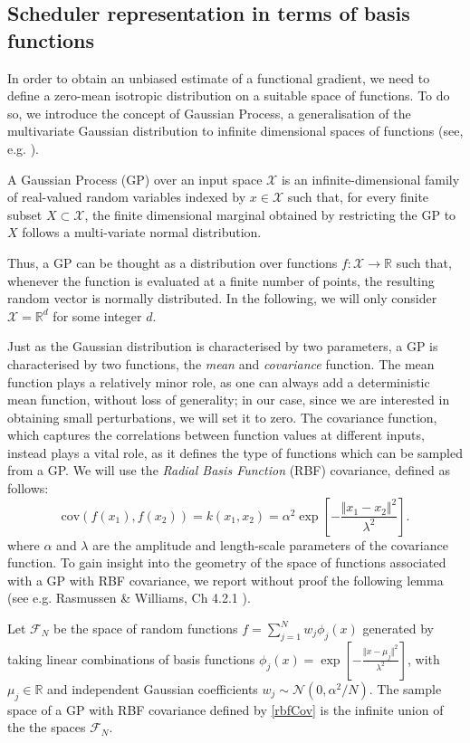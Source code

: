 \subsection{Scheduler representation in terms of basis functions}

In order to obtain an unbiased estimate of a functional gradient, we need to define a zero-mean isotropic distribution on a suitable space of functions. To do so, we introduce the concept of Gaussian Process, a generalisation of the multivariate Gaussian distribution to infinite dimensional spaces of functions (see, e.g. \cite{Rasmussen2006}).

\begin{definition} A Gaussian Process (GP) over an input space $\mathcal{X}$ is an infinite-dimensional family of real-valued random variables indexed by $x\in\mathcal{X}$ such that, for every finite subset $X\subset\mathcal{X}$, the finite dimensional marginal obtained by restricting the GP to $X$ follows a multi-variate normal distribution.
\end{definition}
Thus, a GP can be thought as a distribution over functions $f\colon\mathcal{X}\rightarrow\mathbb{R}$ such that, whenever the function is evaluated at a finite number of points, the resulting random vector is normally distributed. In the following, we will only consider $\mathcal{X}=\mathbb{R}^d$ for some integer $d$.

Just as the Gaussian distribution is characterised by two parameters, a GP is characterised by two functions, the {\it mean} and {\it covariance} function. The mean function plays a relatively minor role, as one can always add a deterministic mean function, without loss of generality; in our case, since we are interested in obtaining small perturbations, we will set it to zero. The covariance function, which captures the correlations between function values at different inputs, instead plays a vital role, as it defines the type of functions which can be sampled from a GP. We will use the {\it Radial Basis Function} (RBF) covariance, defined as follows:
\begin{equation}
\mathrm{cov}(f(x_1),f(x_2))=k(x_1,x_2)=\alpha^2\exp\left[-\frac{\Vert x_1-x_2\Vert^2}{\lambda^2}\right].\label{rbfCov}
\end{equation}
where $\alpha$ and $\lambda$ are the amplitude and length-scale parameters of the covariance function.
To gain insight into the geometry of the space of functions associated with a GP with RBF covariance, we report without proof the following lemma (see e.g. Rasmussen \& Williams, Ch 4.2.1 \cite{Rasmussen2006}).
\begin{lemma}\label{denseLemma}
Let $\mathcal{F}_N$ be the space of random functions $f=\sum_{j=1}^N w_j\phi_j(x)$  generated by taking linear combinations of basis functions  $\phi_j(x)=\exp\left[-\frac{\Vert x-\mu_j\Vert^2}{\lambda^2}\right]$, with $\mu_j\in\mathbb{R}$ and independent Gaussian coefficients $w_j\sim\mathcal{N}(0,\alpha^2/N)$.
The sample space of a GP with RBF covariance defined by \eqref{rbfCov} is the infinite union of the the spaces $\mathcal{F}_N$.
\end{lemma}

